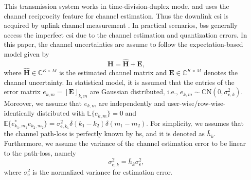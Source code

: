 \documentclass[12pt,draftclsnofoot,onecolumn,journal]{IEEEtran}
\begin{document}
This transmission system works in time-division-duplex mode, and uses the channel reciprocity feature for channel estimation. Thus the downlink \ac{csi} is acquired by uplink channel measurement \cite{han2010potential}. In practical scenarios, \acp{bs} generally access the imperfect \ac{csi} due to the channel estimation and quantization errors. In this paper, the channel uncertainties are assume to follow the expectation-based model given by \cite{gershman2010convex}
\begin{equation}
	\mathbf H=\hat{\mathbf H}+\mathbf E,
\end{equation}
where $\hat{\mathbf H}\in\mathbb C^{K\times M}$ is the estimated channel matrix and $\mathbf E\in\mathbb C^{K\times M}$ denotes the channel uncertainty. In statistical model, it is assumed that the entries of the error matrix $e_{k, m}=\left[ \mathbf E\right]_{k, m}$ are Gaussian distributed, i.e.,  $e_{k,m}\sim \mathrm{CN}(0, \sigma_{\mathrm{e}, k}^2)$. Moreover, we assume that $e_{k,m}$ are independently and user-wise/row-wise-identically distributed with $\mathbb E\{e_{k,m}\}=0$ and $\mathbb E\{e_{k_1,m_1}^*e_{k_2,m_2}\}=\sigma_{\mathrm{e}, k_1}^2\delta(k_1-k_2)\delta(m_1-m_2)$. For simplicity, we assumes that the channel path-loss is perfectly known by \ac{bs}, and it is denoted as $\bar h_k$. Furthermore, we assume the variance of the channel estimation error to be linear to the path-loss, namely
\begin{equation}
\sigma_{\mathrm e, k}^2=\bar h_k\sigma_{\mathrm e}^2,
\end{equation}
where $\sigma_{\mathrm e}^2$ is the normalized variance for estimation error.
\end{document}
